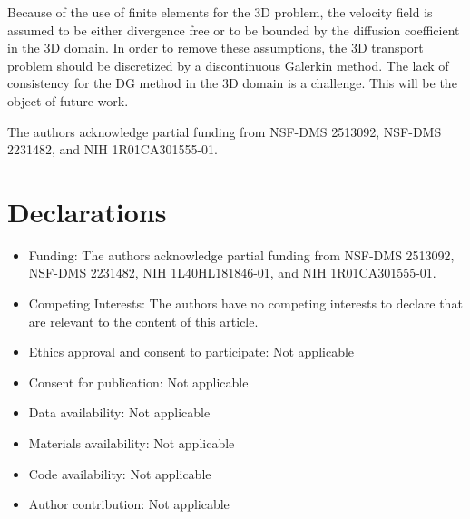 \documentclass[pdflatex,sn-mathphys-num]{sn-jnl}%
\theoremstyle{thmstyleone}%
\theoremstyle{thmstyletwo}%
\theoremstyle{thmstylethree}%
\begin{document}
Because of the use of finite elements for the 3D problem, the velocity field is assumed to be either divergence free or to be bounded by the diffusion coefficient in the 3D domain.  In order to remove these assumptions, the 3D transport problem should be discretized by a discontinuous Galerkin method.  The lack of consistency for the DG method in the 3D domain is a challenge.  This will be the object of future work. 



\backmatter


The authors acknowledge partial funding from NSF-DMS 2513092, NSF-DMS 2231482, and NIH 1R01CA301555-01. 


\section*{Declarations}



\begin{itemize}
\item Funding: The authors acknowledge partial funding from NSF-DMS 2513092, NSF-DMS 2231482, NIH 1L40HL181846-01, and NIH 1R01CA301555-01.
 \item Competing Interests: The authors have no competing interests to declare that are relevant to the content of this article.
\item Ethics approval and consent to participate: Not applicable
\item Consent for publication: Not applicable
\item Data availability: Not applicable
\item Materials availability: Not applicable
\item Code availability: Not applicable 
\item Author contribution: Not applicable
\end{itemize}

\end{document}
